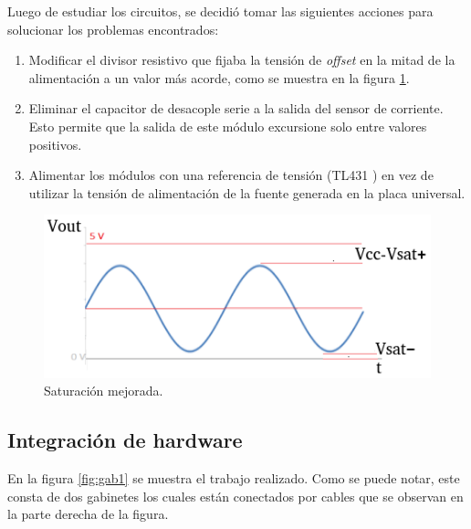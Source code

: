 Luego de estudiar los circuitos, se decidió tomar las siguientes acciones para solucionar los problemas encontrados:
\begin{enumerate}
\item Modificar el divisor resistivo que fijaba la tensión de \textit{offset} en la mitad de la alimentación a un valor más acorde, como se muestra en la figura  \ref{fig:sensSatMej}.
\item Eliminar el capacitor de desacople serie a la salida del sensor de corriente. Esto permite que la salida de este módulo excursione solo entre valores positivos.
\item Alimentar los módulos con una referencia de tensión (TL431 \citep{TL431}) en vez de utilizar la tensión de alimentación de la fuente generada en la placa universal.
\end{enumerate}

\begin{figure}[htpb]
	\centering
	\includegraphics[scale=1]{./Figures/ZMPT101B_waves_sat_mod.png}
	\caption{Saturación mejorada.}
	\label{fig:sensSatMej}
\end{figure}


\subsection{Integración de hardware}

En la figura \ref{fig:gab1} se muestra el trabajo realizado. Como se puede notar, este consta de dos gabinetes los cuales están conectados por cables que se  observan en la parte derecha de la figura. 

